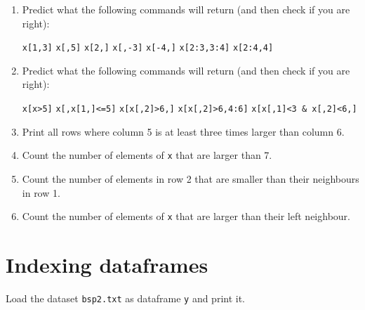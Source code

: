 \documentclass{article}
\begin{document}
\begin{enumerate}
\item Predict what the following commands will return (and then check if you
are right):

\texttt{x[1,3]}\newline
\texttt{x[,5]}\newline
\texttt{x[2,]}\newline
\texttt{x[,-3]}\newline
\texttt{x[-4,]}\newline
\texttt{x[2:3,3:4]}\newline
\texttt{x[2:4,4]}

\item Predict what the following commands will return (and then check if you
are right):

\texttt{x[x>5]}\newline
\texttt{x[,x[1,]<=5]}\newline
\texttt{x[x[,2]>6,]}\newline
\texttt{x[x[,2]>6,4:6]}\newline
\texttt{x[x[,1]<3 \& x[,2]<6,]}

\item Print all rows where column 5 is at least three times larger than
column 6.

\item Count the number of elements of \texttt{x} that are larger than 7.

\item Count the number of elements in row 2 that are smaller than their
neighbours in row 1.

\item Count the number of elements of \texttt{x} that are larger than their
left neighbour.
\end{enumerate}
\newpage


\section{Indexing dataframes}

Load the dataset \texttt{bsp2.txt} as dataframe \texttt{y} and print it.
\end{document}
